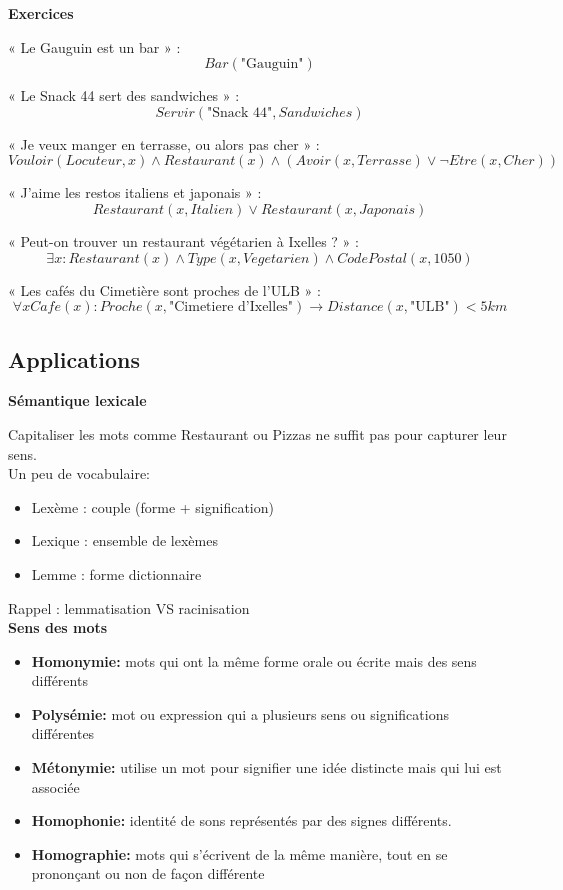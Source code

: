 \textbf{Exercices}

« Le Gauguin est un bar » : $$Bar(\text{"Gauguin"})$$

« Le Snack 44 sert des sandwiches » : $$Servir(\text{"Snack 44"}, Sandwiches)$$

« Je veux manger en terrasse, ou alors pas cher » : $$Vouloir(Locuteur, x) \land Restaurant(x) \land ( Avoir(x, Terrasse) \lor \neg Etre(x, Cher) )$$

« J'aime les restos italiens et japonais » : $$Restaurant(x, Italien) \lor Restaurant(x, Japonais)$$

« Peut-on trouver un restaurant végétarien à Ixelles ? » : $$ \exists x: Restaurant(x) \land Type(x, Vegetarien) \land CodePostal(x, 1050) $$

« Les cafés du Cimetière sont proches de l'ULB » : $$ \forall x Cafe(x) : Proche(x, \text{"Cimetiere d'Ixelles"}) \rightarrow Distance(x, \text{"ULB"}) < 5km $$

\newpage

\subsection{Applications}

\textbf{Sémantique lexicale}

Capitaliser les mots comme Restaurant ou Pizzas ne suffit pas pour capturer leur sens.\\

Un peu de vocabulaire:

\begin{itemize}
    \item Lexème : couple (forme + signification)
    \item Lexique : ensemble de lexèmes
    \item Lemme : forme dictionnaire\\
\end{itemize}

Rappel : lemmatisation VS racinisation\\

\textbf{Sens des mots}

\begin{itemize}
\item \textbf{Homonymie:} mots qui ont la même forme orale ou écrite mais des sens différents
\item \textbf{Polysémie:} mot ou expression qui a plusieurs sens ou significations différentes
\item \textbf{Métonymie:} utilise un mot pour signifier une idée distincte mais qui lui est associée
\item \textbf{Homophonie:} identité de sons représentés par des signes différents.
\item \textbf{Homographie:} mots qui s'écrivent de la même manière, tout en se prononçant ou non de façon différente\\
\end{itemize}

